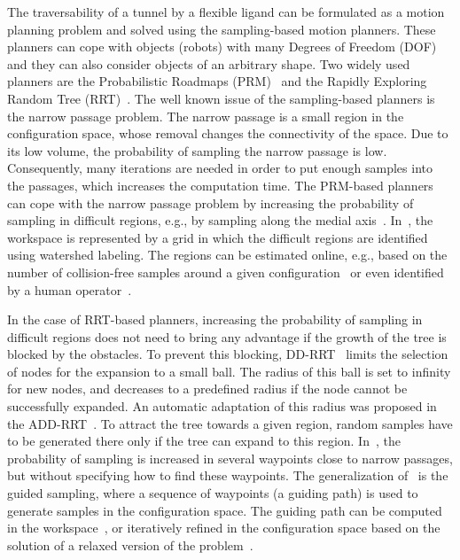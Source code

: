 \documentclass{bmcart}
\begin{document}
The traversability of a tunnel by a flexible ligand can be formulated as a motion planning problem and solved using the sampling-based motion planners.
These planners can cope with objects (robots) with many Degrees of Freedom (DOF) and they can also consider objects of an arbitrary shape.
Two widely used planners are the Probabilistic Roadmaps (PRM)~\cite{kavrakiForPP} and the Rapidly Exploring Random Tree (RRT)~\cite{lavalleRRT}.
The well known issue of the sampling-based planners is the narrow passage problem.
The narrow passage is a small region in the configuration space, whose removal changes the connectivity of the space.
Due to its low volume, the probability of sampling the narrow passage is low.
Consequently, many iterations are needed in order to put enough samples into the passages, which increases the computation time.
The PRM-based planners can cope with the narrow passage problem by increasing the probability of sampling in difficult regions, e.g., by sampling along the medial axis~\cite{wilmarthMAPRM}.
In~\cite{bergWIG}, the workspace is represented by a grid in which the difficult regions are identified using watershed labeling.
The regions can be estimated online, e.g., based on the number of collision-free samples around a given configuration~\cite{overmarsGauss,hsuBridge} or even identified by a human operator~\cite{denny2018general}. 

In the case of RRT-based planners, increasing the probability of sampling in difficult regions does not need to bring any advantage
if the growth of the tree is blocked by the obstacles.
To prevent this blocking, DD-RRT~\cite{yershovaDDRRT} limits the selection of nodes for the expansion to a small ball. 
The radius of this ball is set to infinity for new nodes, and decreases to a predefined radius if the node cannot be successfully expanded.
An automatic adaptation of this radius was proposed in the ADD-RRT~\cite{jailletADRRT}.
To attract the tree towards a given region, random samples have to be generated there only if the tree can expand to this region.
In~\cite{kardossRRTKK}, the probability of sampling is increased in several waypoints close to narrow passages, but without specifying how to find these waypoints.
The generalization of~\cite{kardossRRTKK} is the guided sampling, where a sequence of waypoints (a guiding path) is used to generate samples in the configuration space.
The guiding path can be computed in the workspace~\cite{vonasek2009rrt}, or iteratively refined in the configuration space based on the solution of a relaxed version of the problem~\cite{bayazitIRC}.
\end{document}
